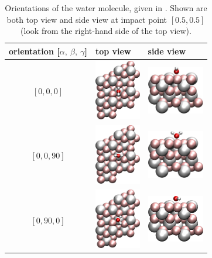 \documentclass[11pt,DIV=13,BCOR=5mm,a4paper,headinclude]{scrbook}
\begin{document}
 \begin{table}[!h]
 \centering
  \caption{Orientations of the water molecule, given in \textdegree.
Shown are both top view and side view at impact point $[0.5,0.5]$ (look from the right-hand side of the top view).}
 \begin{tabular}{cp{4cm}p{4cm}}
 \toprule
orientation [$\alpha,~\beta,~\gamma$]& top view & side view \\\midrule
$[0, 0, 0]$  & \includegraphics[width=2cm,angle=90]{figures/0001/Ausrichtungsbilder/0_0_0-toptest.png}
&\includegraphics[width=2.5cm]{figures/0001/Ausrichtungsbilder/0_0_0-sidetest.png}\\
$[0, 0, 90]$   & \includegraphics[width=2cm,angle=90]{figures/0001/Ausrichtungsbilder/0_0_90-toptest.png}
& \includegraphics[width=2.5cm]{figures/0001/Ausrichtungsbilder/0_0_90-sidetest.png}\\
$[0, 90, 0]$   & \includegraphics[width=2cm,angle=90]{figures/0001/Ausrichtungsbilder/0_90_0-toptest.png}
& \includegraphics[width=2.5cm]{figures/0001/Ausrichtungsbilder/0_90_0-sidetest.png}\\

\end{tabular}
\end{table}
\end{document}
